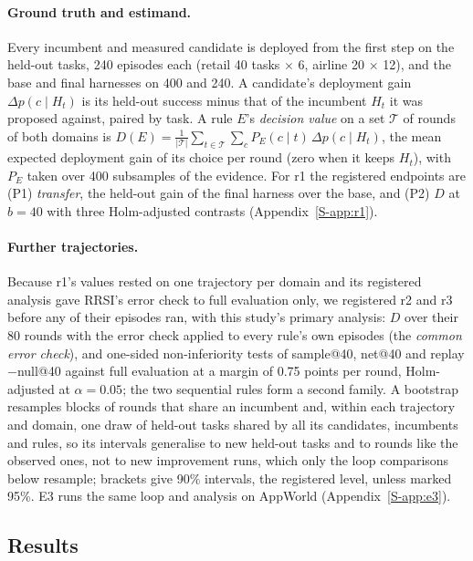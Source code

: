 \documentclass[11pt]{article}
\begin{document}
\paragraph{Ground truth and estimand.} Every incumbent and measured candidate is deployed from the first step on the held-out tasks, 240 episodes each (retail 40 tasks $\times$ 6, airline 20 $\times$ 12), and the base and final harnesses on 400 and 240. A candidate's deployment gain $\Delta p(c\mid H_t)$ is its held-out success minus that of the incumbent $H_t$ it was proposed against, paired by task. A rule $E$'s \emph{decision value} on a set $\mathcal{T}$ of rounds of both domains is $D(E)=\frac{1}{|\mathcal{T}|}\sum_{t\in\mathcal{T}}\sum_c P_E(c\mid t)\,\Delta p(c\mid H_t)$, the mean expected deployment gain of its choice per round (zero when it keeps $H_t$), with $P_E$ taken over 400 subsamples of the evidence. For r1 the registered endpoints are (P1) \emph{transfer}, the held-out gain of the final harness over the base, and (P2) $D$ at $b=40$ with three Holm-adjusted contrasts (Appendix~\ref*{S-app:r1}).

\paragraph{Further trajectories.} Because r1's values rested on one trajectory per domain and its registered analysis gave RRSI's error check to full evaluation only, we registered r2 and r3 before any of their episodes ran, with this study's primary analysis: $D$ over their 80 rounds with the error check applied to every rule's own episodes (the \emph{common error check}), and one-sided non-inferiority tests of sample@40, net@40 and replay$-$null@40 against full evaluation at a margin of 0.75 points per round, Holm-adjusted at $\alpha=0.05$; the two sequential rules form a second family. A bootstrap resamples blocks of rounds that share an incumbent and, within each trajectory and domain, one draw of held-out tasks shared by all its candidates, incumbents and rules, so its intervals generalise to new held-out tasks and to rounds like the observed ones, not to new improvement runs, which only the loop comparisons below resample; brackets give 90\% intervals, the registered level, unless marked 95\%. E3 runs the same loop and analysis on AppWorld \citep{trivedi2024appworld} (Appendix~\ref*{S-app:e3}).

\subsection{Results}
\label{sec:e1res}
\end{document}

